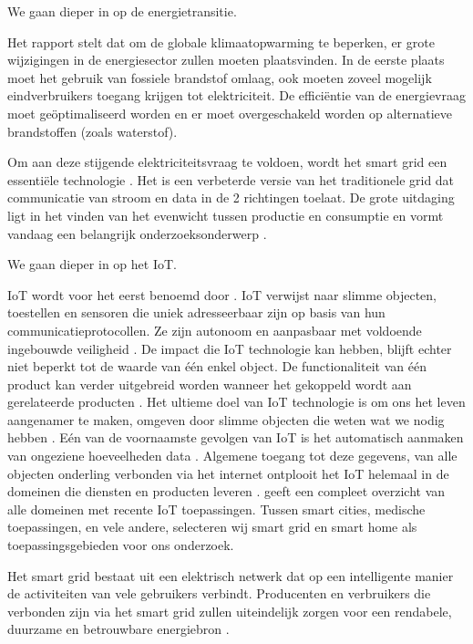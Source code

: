 \documentclass{hogent-article}
\begin{document}
    We gaan dieper in op de energietransitie.
    
    Het \textcite{IPCC2022} rapport stelt dat om de globale klimaatopwarming te beperken, er grote wijzigingen in de energiesector zullen moeten plaatsvinden. In de eerste plaats moet het gebruik van fossiele brandstof omlaag, ook moeten zoveel mogelijk eindverbruikers toegang krijgen tot elektriciteit. De efficiëntie van de energievraag moet geöptimaliseerd worden en er moet overgeschakeld worden op alternatieve brandstoffen (zoals waterstof).
    
    Om aan deze stijgende elektriciteitsvraag te voldoen, wordt het smart grid een essentiële technologie \autocite{Patel2022}. Het is een verbeterde versie van het traditionele grid dat communicatie van stroom en data in de 2 richtingen toelaat. De grote uitdaging ligt in het vinden van het evenwicht tussen productie en consumptie en vormt vandaag een belangrijk onderzoeksonderwerp \autocite{KouveliotisLysikatos2022}.
    
    We gaan dieper in op het IoT.
    
    IoT wordt voor het eerst benoemd door \textcite{Ashton2009}. IoT verwijst naar slimme objecten, toestellen en sensoren die uniek adresseerbaar zijn op basis van hun communicatieprotocollen. Ze zijn autonoom en aanpasbaar met voldoende ingebouwde veiligheid \autocite{Shafique2020}. De impact die IoT technologie kan hebben, blijft echter niet beperkt tot de waarde van één enkel object. De functionaliteit van één product kan verder uitgebreid worden wanneer het gekoppeld wordt aan gerelateerde producten \autocite{Wortmann2015}. Het ultieme doel van IoT technologie is om ons het leven aangenamer te maken, omgeven door slimme objecten die weten wat we nodig hebben \autocite{Kassab2020}. Eén van de voornaamste gevolgen van IoT is het automatisch aanmaken van ongeziene hoeveelheden data \autocite{Gubbi2013} \autocite{Kassab2020}. Algemene toegang tot deze gegevens, van alle objecten onderling verbonden via het internet ontplooit het IoT helemaal in de domeinen die diensten en producten leveren \autocite{Gubbi2013}. \textcite{Kassab2020} geeft een compleet overzicht van alle domeinen met recente IoT toepassingen. Tussen smart cities, medische toepassingen, en vele andere, selecteren wij smart grid en smart home als toepassingsgebieden voor ons onderzoek.
    
    Het smart grid bestaat uit een elektrisch netwerk dat op een intelligente manier de activiteiten van vele gebruikers verbindt. Producenten en verbruikers die verbonden zijn via het smart grid zullen uiteindelijk zorgen voor een rendabele, duurzame en betrouwbare energiebron \autocite{Kassab2020} .
    
\end{document}
